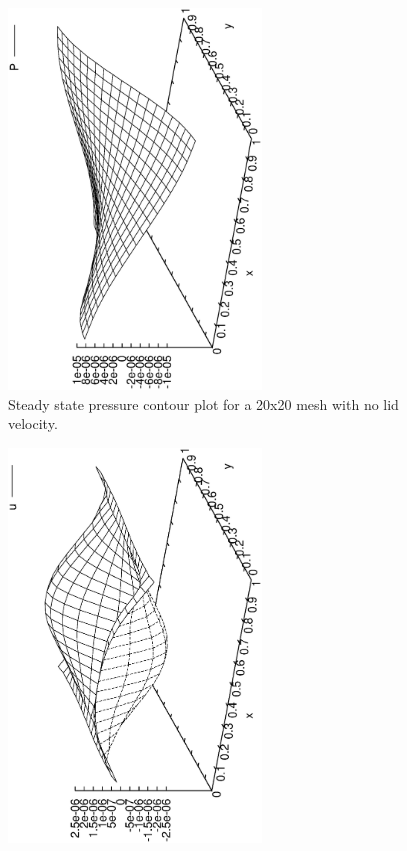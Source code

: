 \documentclass[a4paper, 10pt]{article}
\begin{document}
\begin{enumerate}[I]
  \begin{figure}
      \centering
      \includegraphics[width=0.6\textwidth, angle = -90]{../plot/stability/solution/P.eps}
      \caption{Steady state pressure contour plot for a 20x20 mesh with no lid velocity.}
      \label{sol1p}
    \end{figure}
    \begin{figure}
      \centering
      \includegraphics[width=0.6\textwidth, angle = -90]{../plot/stability/solution/u.eps}

\end{figure}
\end{enumerate}
\end{document}
